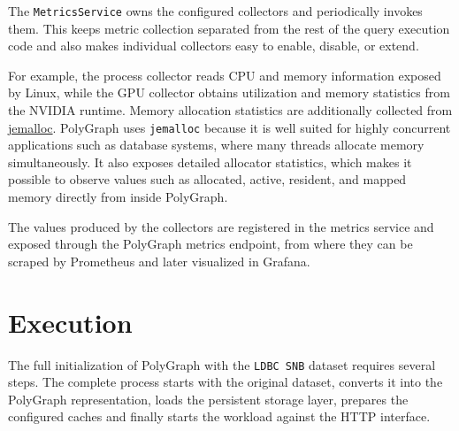 \documentclass[11pt,a4paper]{article}
\begin{document}
The \texttt{MetricsService} owns the configured collectors and periodically
invokes them. This keeps metric collection separated from the rest of the
query execution code and also makes individual collectors easy to enable,
disable, or extend.

For example, the process collector reads CPU and memory information exposed by
Linux, while the GPU collector obtains utilization and memory statistics from
the NVIDIA runtime. Memory allocation statistics are additionally collected
from \href{https://jemalloc.net/}{jemalloc}. PolyGraph uses \texttt{jemalloc}
because it is well suited for highly concurrent applications such as database
systems, where many threads allocate memory simultaneously. It also exposes
detailed allocator statistics, which makes it possible to observe values such
as allocated, active, resident, and mapped memory directly from inside
PolyGraph.

The values produced by the collectors are registered in the metrics service
and exposed through the PolyGraph metrics endpoint, from where they can be
scraped by Prometheus and later visualized in Grafana.


\section{Execution}

The full initialization of PolyGraph with the \texttt{LDBC SNB} dataset requires several steps. The complete process starts with the original dataset, converts it into the PolyGraph representation, loads the persistent storage layer, prepares the configured caches and finally starts the workload against the HTTP interface.
\end{document}
